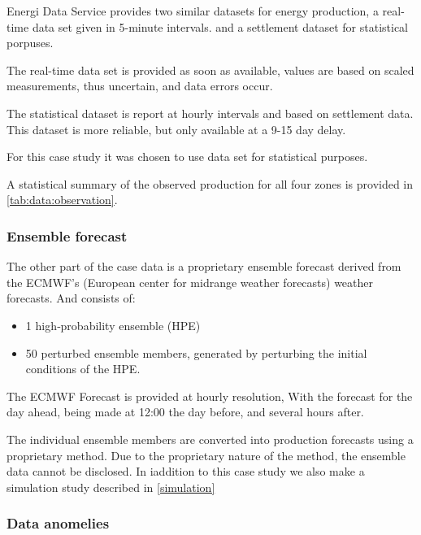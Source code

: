 Energi Data Service provides two similar datasets for energy production, a real-time data set given in 5-minute intervals. and a settlement dataset for statistical  porpuses.

The real-time data set is provided as soon as available, values are based on scaled measurements, thus uncertain, and data errors occur. \cite{energinet_electricityprodex5min_2020}

The statistical dataset is report at hourly intervals and based on settlement data. This dataset is more reliable, but only available at a 9-15 day delay.\cite{energinet_production_consumption_settlement_2020}

For this case study it was chosen to use data set for statistical purposes.

A statistical summary of the observed production for all four zones is provided in \cref{tab:data:observation}.



\subsubsection{Ensemble forecast}
The other part of the case data is a proprietary ensemble forecast derived from the ECMWF's (European center for midrange weather forecasts) weather forecasts. And consists of:

\begin{itemize}
    \item 1 high‑probability ensemble (HPE)
    \item 50 perturbed ensemble members, generated by perturbing the initial conditions of the HPE.
\end{itemize}

 The ECMWF Forecast is provided at hourly resolution, With the forecast for the day ahead, being made at 12:00 the day before, and several hours after. \cite{ecmwf_about_forecasts}

The individual ensemble members are converted into production forecasts using a proprietary method. Due to the proprietary nature of the method, the ensemble data cannot be disclosed. In iaddition to this case study we also make a simulation study described in \cref{simulation}

\subsubsection{Data anomelies}

